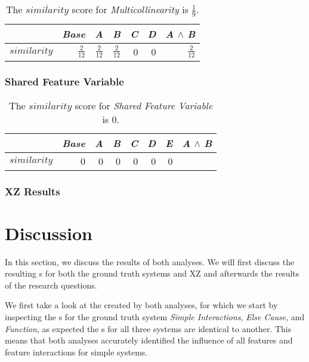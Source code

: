 \begin{table}[H]
    \centering
    \begin{tabular}{lrrrrrr}    \toprule
               & \emph{Base} & \emph{A} & \emph{B} & \emph{C} & \emph{D} & \emph{A} $\land$ \emph{B}   \\ \midrule
    $similarity$ & $\frac{2}{12}$ & $ \frac{2}{12}$ &  $\frac{2}{12}$ & 0 & 0 &  $\frac{2}{12}$      \\ \bottomrule
    \end{tabular}
    \caption{The $\overline{similarity}$ score for \emph{Multicollinearity} is $\frac{1}{9}$.}
\end{table}

\subsubsection*{Shared Feature Variable} %

\begin{table}[H]
    \centering
    \begin{tabular}{lrrrrrrr}    \toprule
               & \emph{Base} & \emph{A} & \emph{B} & \emph{C} & \emph{D} & \emph{E} & \emph{A} $\land$ \emph{B}   \\ \midrule
    $similarity$ & 0 & 0 & 0 & 0 & 0 & 0      \\ \bottomrule
    \end{tabular}
    \caption{The $\overline{similarity}$ score for \emph{Shared Feature Variable} is $0$.}
\end{table}

\subsubsection*{XZ Results}

\section{Discussion}\label{sec:discussion}

In this section, we discuss the results of both analyses. We will first discuss the resulting {\perfInfluenceModel}s 
for both the ground truth systems and \textsc{XZ} and afterwards the results of the research questions.

We first take a look at the {\perfInfluenceModel} created by both analyses, 
for which we start by inspecting the {\perfInfluenceModel}s for the ground truth system \emph{Simple Interactions}, 
\emph{Else Cause}, and \emph{Function}, as expected the {\perfInfluenceModel}s for all three systems are identical to another. 
This means that both analyses accurately identified the influence of all features and feature interactions for simple systems.

